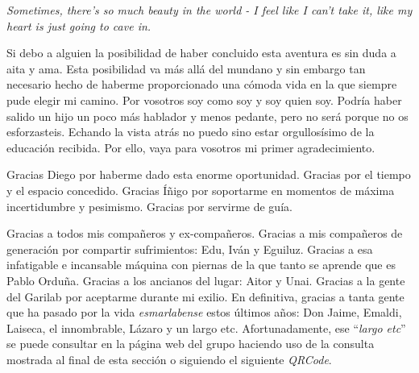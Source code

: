 



\begin{acknowledgements}      

\begin{flushright}
\emph{Sometimes, there's so much beauty in the world - I feel like I can't take it, like my heart is just going to cave in.}
\end{flushright}

\bigskip

Si debo a alguien la posibilidad de haber concluido esta aventura es sin duda a aita y ama.
Esta posibilidad va más allá del mundano y sin embargo tan necesario hecho de haberme proporcionado una cómoda vida en la que siempre pude elegir mi camino.
Por vosotros soy como soy y soy quien soy.
Podría haber salido un hijo un poco más hablador y menos pedante, pero no será porque no os esforzasteis.
Echando la vista atrás no puedo sino estar orgullosísimo de la educación recibida.
Por ello, vaya para vosotros mi primer agradecimiento.


Gracias Diego por haberme dado esta enorme oportunidad.
Gracias por el tiempo y el espacio concedido.
Gracias Íñigo por soportarme en momentos de máxima incertidumbre y pesimismo.
Gracias por servirme de guía.


Gracias a todos mis compañeros y ex-compañeros.
Gracias a mis compañeros de generación por compartir sufrimientos: Edu, Iván y Eguiluz.
Gracias a esa infatigable e incansable máquina con piernas de la que tanto se aprende que es Pablo Orduña.
Gracias a los ancianos del lugar: Aitor y Unai.
Gracias a la gente del Garilab por aceptarme durante mi exilio.
En definitiva, gracias a tanta gente que ha pasado por la vida \emph{esmarlabense} estos últimos años: Don Jaime, Emaldi, Laiseca, el innombrable, Lázaro y un largo etc.
Afortunadamente, ese ``\emph{largo etc}'' se puede consultar en la página web del grupo haciendo uso de la consulta mostrada al final de esta sección o siguiendo el siguiente \emph{QRCode}.




\end{acknowledgements}
